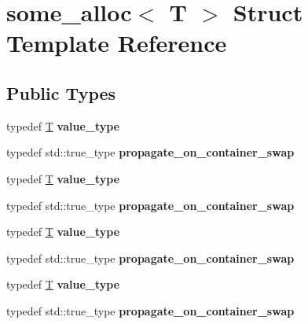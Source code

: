 \hypertarget{structsome__alloc}{}\section{some\+\_\+alloc$<$ T $>$ Struct Template Reference}
\label{structsome__alloc}
\subsection*{Public Types}
\begin{DoxyCompactItemize}
\item 
\mbox{\label{structsome__alloc_a41022544a2b3ffeb4ffce92f759eb30b}} 
typedef \mbox{\hyperlink{struct_t}{T}} {\bfseries value\+\_\+type}
\item 
\mbox{\label{structsome__alloc_aad61c49c6ad5f1ca6dfb3f5d38d70d57}} 
typedef std\+::true\+\_\+type {\bfseries propagate\+\_\+on\+\_\+container\+\_\+swap}
\item 
\mbox{\label{structsome__alloc_a41022544a2b3ffeb4ffce92f759eb30b}} 
typedef \mbox{\hyperlink{struct_t}{T}} {\bfseries value\+\_\+type}
\item 
\mbox{\label{structsome__alloc_aad61c49c6ad5f1ca6dfb3f5d38d70d57}} 
typedef std\+::true\+\_\+type {\bfseries propagate\+\_\+on\+\_\+container\+\_\+swap}
\item 
\mbox{\label{structsome__alloc_a41022544a2b3ffeb4ffce92f759eb30b}} 
typedef \mbox{\hyperlink{struct_t}{T}} {\bfseries value\+\_\+type}
\item 
\mbox{\label{structsome__alloc_aad61c49c6ad5f1ca6dfb3f5d38d70d57}} 
typedef std\+::true\+\_\+type {\bfseries propagate\+\_\+on\+\_\+container\+\_\+swap}
\item 
\mbox{\label{structsome__alloc_a41022544a2b3ffeb4ffce92f759eb30b}} 
typedef \mbox{\hyperlink{struct_t}{T}} {\bfseries value\+\_\+type}
\item 
\mbox{\label{structsome__alloc_aad61c49c6ad5f1ca6dfb3f5d38d70d57}} 
typedef std\+::true\+\_\+type {\bfseries propagate\+\_\+on\+\_\+container\+\_\+swap}

\end{DoxyCompactItemize}
